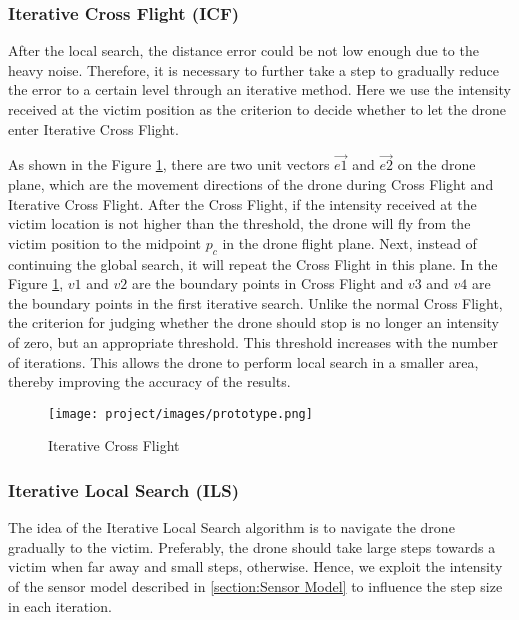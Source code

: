 \documentclass[conference]{IEEEtran}
\begin{document}
\subsubsection{Iterative Cross Flight (ICF)}

After the local search, the distance error could be not low enough due to the heavy noise. Therefore, it is necessary to further take a step to gradually reduce the error to a certain level through an iterative method. Here we use the intensity received at the victim position as the criterion to decide whether to let the drone enter Iterative Cross Flight. 

As shown in the Figure \ref{fig:cross_section_mountain}, there are two unit vectors $\overrightarrow{e1}$ and $\overrightarrow{e2}$ on the drone plane, which are the movement directions of the drone during Cross Flight and Iterative Cross Flight. After the Cross Flight, if the intensity received at the victim location is not higher than the threshold, the drone will fly from the victim position to the midpoint $p_{c}$ in the drone flight plane. Next, instead of continuing the global search, it will repeat the Cross Flight in this plane. In the Figure \ref{fig:cross_section_mountain}, $v1$ and $v2$ are the boundary points in Cross Flight and $v3$ and $v4$ are the boundary points in the first iterative search. Unlike the normal Cross Flight, the criterion for judging whether the drone should stop is no longer an intensity of zero, but an appropriate threshold. This threshold increases with the number of iterations. This allows the drone to perform local search in a smaller area, thereby improving the accuracy of the results. 

\begin{figure}[h!]
    \centering
    \texttt{[image: project/images/prototype.png]}
    \caption{Iterative Cross Flight}
    \label{fig:cross_section_mountain}
\end{figure}

\subsubsection{Iterative Local Search (ILS)}\label{subsubsection:Iterative Local Search (ILS)}

The idea of the Iterative Local Search algorithm is to navigate the drone gradually to the victim. Preferably, the drone should take large steps towards a victim when far away and small steps, otherwise. Hence, we exploit the intensity of the sensor model described in \ref{section:Sensor Model} to influence the step size in each iteration.
\end{document}
